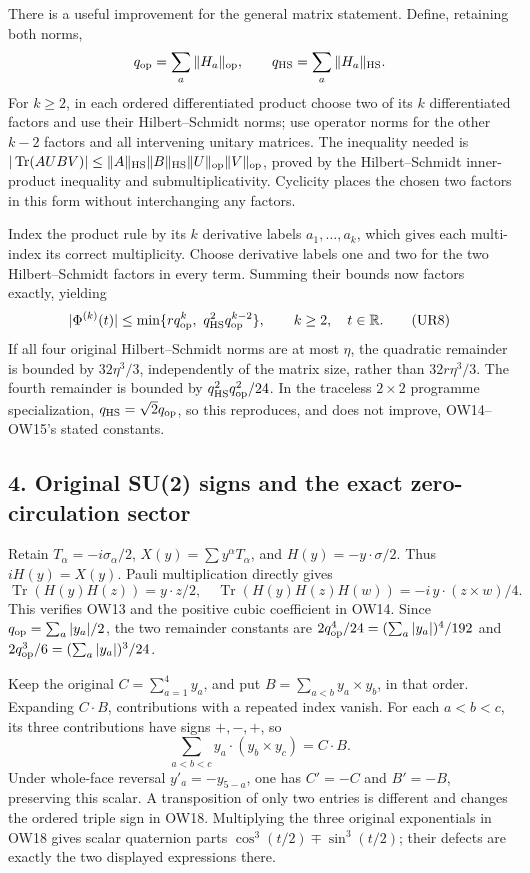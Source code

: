 \documentclass[11pt]{article}
\begin{document}
There is a useful improvement for the general matrix statement. Define, retaining both norms,
\[
 q_{\rm op}=\sum_a\|H_a\|_{\rm op},\qquad
 q_{\rm HS}=\sum_a\|H_a\|_{\rm HS}.
\]
For \(k\ge2\), in each ordered differentiated product choose two of its \(k\) differentiated factors and use their Hilbert–Schmidt norms; use operator norms for the other \(k-2\) factors and all intervening unitary matrices. The inequality needed is
\(|\operatorname{Tr}(AUBV)|\le\|A\|_{\rm HS}\|B\|_{\rm HS}\|U\|_{\rm op}\|V\|_{\rm op}\), proved by the Hilbert–Schmidt inner-product inequality and submultiplicativity. Cyclicity places the chosen two factors in this form without interchanging any factors.

Index the product rule by its \(k\) derivative labels \(a_1,\ldots,a_k\), which gives each multi-index its correct multiplicity. Choose derivative labels one and two for the two Hilbert–Schmidt factors in every term. Summing their bounds now factors exactly, yielding
\[
 |\Phi^{(k)}(t)|
 \le\min\{r q_{\rm op}^k,\ q_{\rm HS}^2q_{\rm op}^{k-2}\},
 \qquad k\ge2,\quad t\in\mathbb R.
 \tag{UR8}
\]
If all four original Hilbert–Schmidt norms are at most \(\eta\), the quadratic remainder is bounded by \(32\eta^3/3\), independently of the matrix size, rather than \(32r\eta^3/3\). The fourth remainder is bounded by \(q_{\rm HS}^2q_{\rm op}^2/24\). In the traceless \(2\times2\) programme specialization, \(q_{\rm HS}=\sqrt2q_{\rm op}\), so this reproduces, and does not improve, OW14–OW15's stated constants.

\subsection*{4. Original SU(2) signs and the exact zero-circulation sector}

Retain \(T_\alpha=-i\sigma_\alpha/2\), \(X(y)=\sum y^\alpha T_\alpha\), and \(H(y)=-y\cdot\sigma/2\). Thus \(iH(y)=X(y)\). Pauli multiplication directly gives
\[
 \operatorname{Tr}(H(y)H(z))=y\cdot z/2,\quad
 \operatorname{Tr}(H(y)H(z)H(w))=-i\,y\cdot(z\times w)/4.
 \tag{UR9}
\]
This verifies OW13 and the positive cubic coefficient in OW14. Since \(q_{\rm op}=\sum_a|y_a|/2\), the two remainder constants are
\(2q_{\rm op}^4/24=(\sum_a|y_a|)^4/192\) and
\(2q_{\rm op}^3/6=(\sum_a|y_a|)^3/24\).

Keep the original \(C=\sum_{a=1}^4y_a\), and put \(B=\sum_{a<b}y_a\times y_b\), in that order. Expanding \(C\cdot B\), contributions with a repeated index vanish. For each \(a<b<c\), its three contributions have signs \(+,-,+\), so
\[
 \sum_{a<b<c}y_a\cdot(y_b\times y_c)=C\cdot B.
 \tag{UR10}
\]
Under whole-face reversal \(y'_a=-y_{5-a}\), one has \(C'=-C\) and \(B'=-B\), preserving this scalar. A transposition of only two entries is different and changes the ordered triple sign in OW18. Multiplying the three original exponentials in OW18 gives scalar quaternion parts \(\cos^3(t/2)\mp\sin^3(t/2)\); their defects are exactly the two displayed expressions there.
\end{document}
